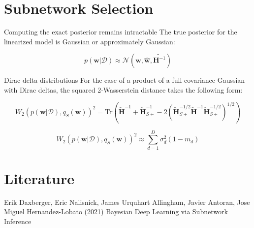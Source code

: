 \documentclass{beamer}
\begin{document}
\section{Subnetwork Selection}
\begin{frame}
\begin{block}{Computing the exact posterior remains intractable}
The true posterior for the linearized model is Gaussian or approximately Gaussian:

\[p(\mathbf{w} | \mathcal{D}) \approx \mathcal{N}(\mathbf{w}, \hat{\mathbf{w}}, \tilde{\mathbf{H}^{-1}})\]
\end{block}

\begin{block}{Dirac delta distributions}
For the case of a product of a full covariance Gaussian with Dirac deltas, the squared 2-Wasserstein distance takes the following form:

\[W_2(p(\mathbf{w} | \mathcal{D}), q_S(\mathbf{w}))^2 = \text{Tr}\left(\tilde{\mathbf{H}}^{-1} + \tilde{\mathbf{H}}_{S+}^{-1} - 2(\tilde{\mathbf{H}}_{S+}^{-1 / 2}\tilde{\mathbf{H}}^{-1}\tilde{\mathbf{H}}_{S+}^{-1 / 2})^{1 / 2}\right)\]

\[W_2(p(\mathbf{w} | \mathcal{D}), q_S(\mathbf{w}))^2 \approx \sum_{d = 1}^D\sigma_d^2(1 - m_d)\]
\end{block}
\end{frame}
\section{Literature}
\begin{frame}
\begin{thebibliography}{99} 
    \footnotesize
    
        Erik Daxberger, Eric Nalisnick, James Urquhart Allingham, Javier Antoran, Jose Miguel Hernandez-Lobato (2021)
        \newblock Bayesian Deep Learning via Subnetwork Inference

\end{thebibliography}
\end{frame}
\end{document}
